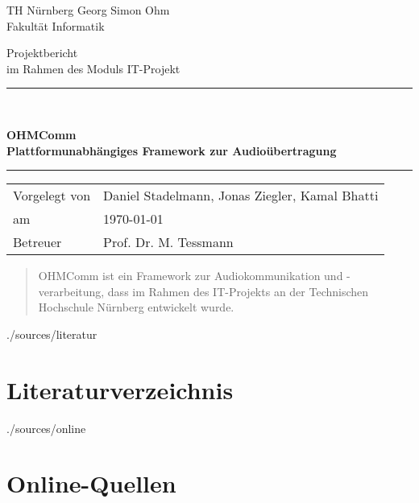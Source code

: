 \documentclass[11pt,a4paper]{report}
\begin{document}
\begin{titlepage}
  \begin{center}
    \parbox[t]{8cm}{
      TH Nürnberg Georg Simon Ohm\\
      Fakultät Informatik \\
	}
    \vfill    
    {\LARGE Projektbericht} \\[0.5cm]
    {\large im Rahmen des Moduls IT-Projekt} \\[5mm]
    \rule{\textwidth}{1pt}\\[0.5cm]
    {\begin{spacing}{1.15} \huge \bfseries OHMComm \\Plattformunabhängiges Framework zur Audioübertragung \\ \end{spacing}}
    \rule{\textwidth}{1pt}    
    \vfill    
    \begin{tabular}{ll} %
      Vorgelegt von & Daniel Stadelmann, Jonas Ziegler, Kamal Bhatti \\
      am & \today \\
      Betreuer & Prof. Dr. M. Tessmann \\
    \end{tabular}    
    \vfill
\end{center}
\end{titlepage}
\cleardoublepage

\begin{abstract} 
OHMComm ist ein Framework zur Audiokommunikation und -verarbeitung, dass im Rahmen des IT-Projekts an der Technischen Hochschule Nürnberg entwickelt wurde.
\end{abstract}

\tableofcontents









\begin{btSect}{./sources/literatur} %
\section*{Literaturverzeichnis}
\btPrintCited
\end{btSect}
\begin{btSect}{./sources/online}
\section*{Online-Quellen}
\btPrintCited
\end{btSect}
\end{document}
